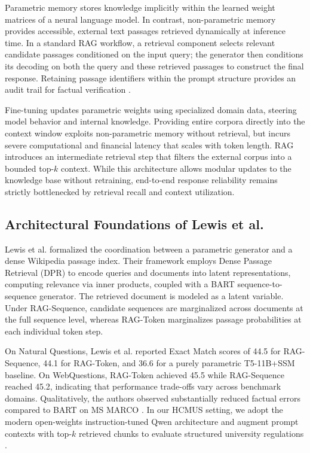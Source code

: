 \documentclass[12pt,a4paper]{article}
\begin{document}
Parametric memory stores knowledge implicitly within the learned weight matrices of a neural language model. In contrast, non-parametric memory provides accessible, external text passages retrieved dynamically at inference time. In a standard RAG workflow, a retrieval component selects relevant candidate passages conditioned on the input query; the generator then conditions its decoding on both the query and these retrieved passages to construct the final response. Retaining passage identifiers within the prompt structure provides an audit trail for factual verification \cite{ref1}.

Fine-tuning updates parametric weights using specialized domain data, steering model behavior and internal knowledge. Providing entire corpora directly into the context window exploits non-parametric memory without retrieval, but incurs severe computational and financial latency that scales with token length. RAG introduces an intermediate retrieval step that filters the external corpus into a bounded top-$k$ context. While this architecture allows modular updates to the knowledge base without retraining, end-to-end response reliability remains strictly bottlenecked by retrieval recall and context utilization.

\subsection{Architectural Foundations of Lewis et al.}

Lewis et al. \cite{ref1} formalized the coordination between a parametric generator and a dense Wikipedia passage index. Their framework employs Dense Passage Retrieval (DPR) to encode queries and documents into latent representations, computing relevance via inner products, coupled with a BART sequence-to-sequence generator. The retrieved document is modeled as a latent variable. Under RAG-Sequence, candidate sequences are marginalized across documents at the full sequence level, whereas RAG-Token marginalizes passage probabilities at each individual token step.

On Natural Questions, Lewis et al. reported Exact Match scores of 44.5 for RAG-Sequence, 44.1 for RAG-Token, and 36.6 for a purely parametric T5-11B+SSM baseline. On WebQuestions, RAG-Token achieved 45.5 while RAG-Sequence reached 45.2, indicating that performance trade-offs vary across benchmark domains. Qualitatively, the authors observed substantially reduced factual errors compared to BART on MS MARCO \cite{ref1}. In our HCMUS setting, we adopt the modern open-weights instruction-tuned Qwen architecture and augment prompt contexts with top-$k$ retrieved chunks to evaluate structured university regulations \cite{ref6}.
\end{document}

